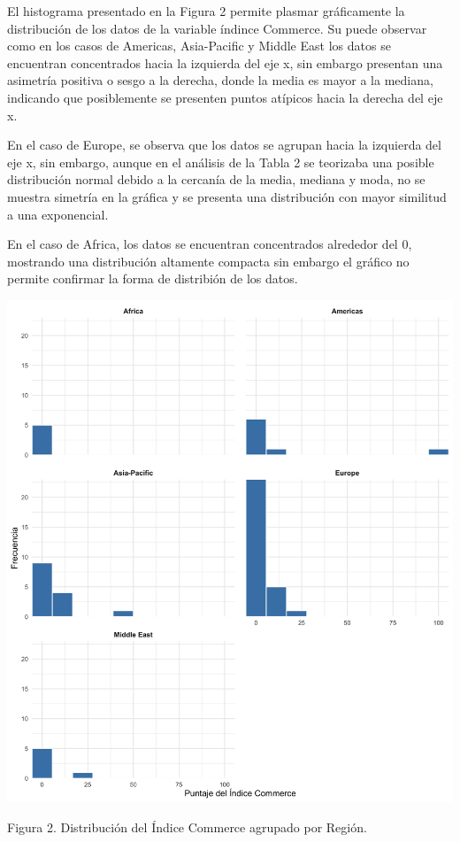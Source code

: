\documentclass[
]{article}
\begin{document}
\begin{multicols}{2}

El histograma presentado en la Figura 2 permite plasmar gráficamente la distribución de los datos de la variable índince Commerce. Su puede observar como en los casos de Americas, Asia-Pacific y Middle East los datos se encuentran concentrados hacia la izquierda del eje x, sin embargo presentan una asimetría positiva o sesgo a la derecha, donde la media es mayor a la mediana, indicando que posiblemente se presenten puntos atípicos hacia la derecha del eje x.

En el caso de Europe, se observa que los datos se agrupan hacia la izquierda del eje x, sin embargo, aunque en el análisis de la Tabla 2 se teorizaba una posible distribución normal debido a la cercanía de la media, mediana y moda, no se muestra simetría en la gráfica y se presenta una distribución con mayor similitud a una exponencial.

En el caso de Africa, los datos se encuentran concentrados alrededor del 0, mostrando una distribución altamente compacta sin embargo el gráfico no permite confirmar la forma de distribión de los datos. 




\begin{center}
\includegraphics[width=\linewidth]{figura2.png}
\end{center}
Figura 2. Distribución del Índice Commerce agrupado por Región.



\end{multicols}
\end{document}
